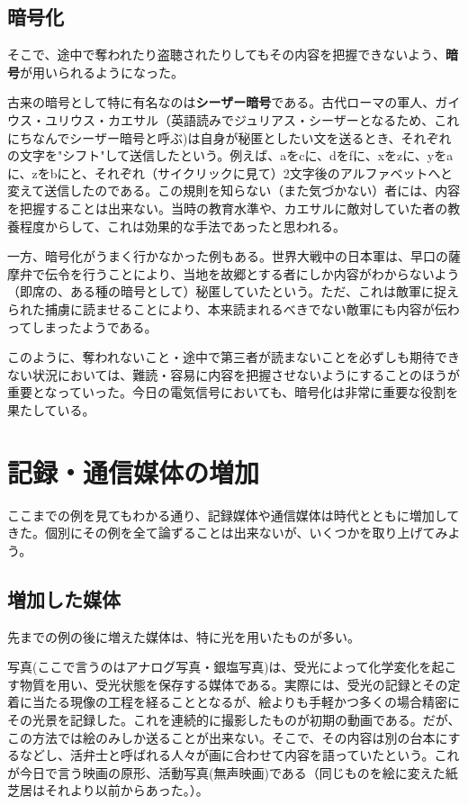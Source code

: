 \subsection{暗号化}

そこで、途中で奪われたり盗聴されたりしてもその内容を把握できないよう、\textbf{暗号}が用いられるようになった。

古来の暗号として特に有名なのは\textbf{シーザー暗号}である。古代ローマの軍人、ガイウス・ユリウス・カエサル（英語読みでジュリアス・シーザーとなるため、これにちなんでシーザー暗号と呼ぶ)は自身が秘匿としたい文を送るとき、それぞれの文字を"シフト"して送信したという。例えば、aをcに、dをfに、xをzに、yをaに、zをbにと、それぞれ（サイクリックに見て）2文字後のアルファベットへと変えて送信したのである。この規則を知らない（また気づかない）者には、内容を把握することは出来ない。当時の教育水準や、カエサルに敵対していた者の教養程度からして、これは効果的な手法であったと思われる。

一方、暗号化がうまく行かなかった例もある。世界大戦中の日本軍は、早口の薩摩弁で伝令を行うことにより、当地を故郷とする者にしか内容がわからないよう（即席の、ある種の暗号として）秘匿していたという。ただ、これは敵軍に捉えられた捕虜に読ませることにより、本来読まれるべきでない敵軍にも内容が伝わってしまったようである。

このように、奪われないこと・途中で第三者が読まないことを必ずしも期待できない状況においては、難読・容易に内容を把握させないようにすることのほうが重要となっていった。今日の電気信号においても、暗号化は非常に重要な役割を果たしている。


\section{記録・通信媒体の増加}

ここまでの例を見てもわかる通り、記録媒体や通信媒体は時代とともに増加してきた。個別にその例を全て論ずることは出来ないが、いくつかを取り上げてみよう。

\subsection{増加した媒体}

先までの例の後に増えた媒体は、特に光を用いたものが多い。

写真(ここで言うのはアナログ写真・銀塩写真)は、受光によって化学変化を起こす物質を用い、受光状態を保存する媒体である。実際には、受光の記録とその定着に当たる現像の工程を経ることとなるが、絵よりも手軽かつ多くの場合精密にその光景を記録した。これを連続的に撮影したものが初期の動画である。だが、この方法では絵のみしか送ることが出来ない。そこで、その内容は別の台本にするなどし、活弁士と呼ばれる人々が画に合わせて内容を語っていたという。これが今日で言う映画の原形、活動写真(無声映画)である（同じものを絵に変えた紙芝居はそれより以前からあった。）。

